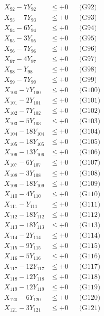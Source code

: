 \documentclass[a4paper,10pt]{article}
\begin{document}
{\begin{align}
\allowbreak
X_{92} - 7Y_{92} &\leq +0 && \text{(G92)} \\
X_{93} - 7Y_{93} &\leq +0 && \text{(G93)} \\
X_{94} - 6Y_{94} &\leq +0 && \text{(G94)} \\
X_{95} - 3Y_{95} &\leq +0 && \text{(G95)} \\
X_{96} - 7Y_{96} &\leq +0 && \text{(G96)} \\
X_{97} - 4Y_{97} &\leq +0 && \text{(G97)} \\
X_{98} - Y_{98} &\leq +0 && \text{(G98)} \\
X_{99} - 7Y_{99} &\leq +0 && \text{(G99)} \\
X_{100} - 7Y_{100} &\leq +0 && \text{(G100)} \\
X_{101} - 2Y_{101} &\leq +0 && \text{(G101)} \\
\allowbreak
X_{102} - 7Y_{102} &\leq +0 && \text{(G102)} \\
X_{103} - 5Y_{103} &\leq +0 && \text{(G103)} \\
X_{104} - 18Y_{104} &\leq +0 && \text{(G104)} \\
X_{105} - 18Y_{105} &\leq +0 && \text{(G105)} \\
X_{106} - 13Y_{106} &\leq +0 && \text{(G106)} \\
X_{107} - 6Y_{107} &\leq +0 && \text{(G107)} \\
X_{108} - 3Y_{108} &\leq +0 && \text{(G108)} \\
X_{109} - 18Y_{109} &\leq +0 && \text{(G109)} \\
X_{110} - 4Y_{110} &\leq +0 && \text{(G110)} \\
X_{111} - Y_{111} &\leq +0 && \text{(G111)} \\
\allowbreak
X_{112} - 18Y_{112} &\leq +0 && \text{(G112)} \\
X_{113} - 18Y_{113} &\leq +0 && \text{(G113)} \\
X_{114} - 2Y_{114} &\leq +0 && \text{(G114)} \\
X_{115} - 9Y_{115} &\leq +0 && \text{(G115)} \\
X_{116} - 5Y_{116} &\leq +0 && \text{(G116)} \\
X_{117} - 12Y_{117} &\leq +0 && \text{(G117)} \\
X_{118} - 12Y_{118} &\leq +0 && \text{(G118)} \\
X_{119} - 12Y_{119} &\leq +0 && \text{(G119)} \\
X_{120} - 6Y_{120} &\leq +0 && \text{(G120)} \\
X_{121} - 3Y_{121} &\leq +0 && \text{(G121)} \\

\end{align}}
\end{document}
